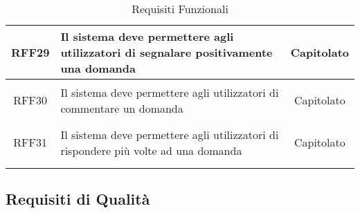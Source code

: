 \begin{longtable}{|c|>{\centering}m{7cm}|c|}
\hypertarget{RFF29}{RFF29} & Il sistema deve permettere agli utilizzatori di segnalare positivamente una domanda & Capitolato
\\ \hline

\hypertarget{RFF30}{RFF30} & Il sistema deve permettere agli utilizzatori di commentare un domanda & Capitolato
\\ \hline

\hypertarget{RFF31}{RFF31} & Il sistema deve permettere agli utilizzatori di rispondere più volte ad una domanda & Capitolato
\\ \hline

\caption[Requisiti Funzionali]{Requisiti Funzionali}
\label{tabella:req0}
\end{longtable}
\clearpage
\subsection{Requisiti di Qualità}
\normalsize

